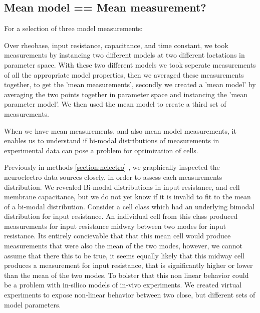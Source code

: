 \subsection{Mean model == Mean measurement?}
For a selection of three model measurements:

Over rheobase, input resistance, capacitance, and time constant, we took measurements by instancing two different models at  two different loctations in parameter space. With these two different models we took seperate measurements of all the appropriate model properties, then we averaged these measurements together, to get the 'mean measurements', secondly we created a 'mean model' by averaging the two points together in parameter space and instancing the 'mean parameter model'. We then used the mean model to create a third set of measurements.

When we have mean measurements, and also mean model measurements, it enables us to understand if bi-modal distributions of measurements in experimental data can pose a problem for optimization of cells.

Previously in methods \ref{section:nelectro} , we graphically inspected the neuroelectro data sources closely, in order to assess each measurements distribution. We revealed Bi-modal distributions in input resistance, and cell membrane capacitance, but we do not yet know if it is invalid to fit to the mean of a bi-modal distribution. Consider a  cell class which had an underlying bimodal distribution for input resistance. An individual cell from this class produced measurements for input resistance midway between two modes for input resistance. Its entirely concievable that that this mean cell would produce measurements that were also the mean of the two modes, however, we cannot assume that there this to be true, it seems equally likely that this midway cell produces a measurement for input resistance, that is significantly higher or lower than the mean of the two modes. To bolster that this non linear behavior could be a problem with in-silico models of in-vivo experiments. We created virtual experiments to expose non-linear behavior between two  close, but different sets of model parameters.


